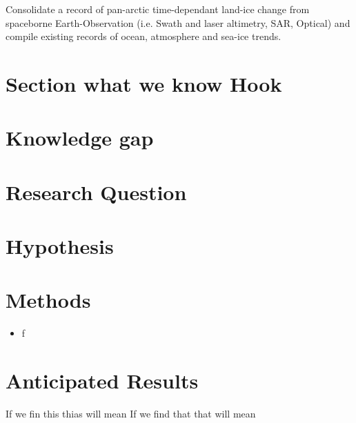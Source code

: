 Consolidate a record of pan-arctic time-dependant land-ice change from spaceborne Earth-Observation (i.e. Swath and laser altimetry, SAR, Optical) and compile existing records of ocean, atmosphere and sea-ice trends.

\section{Section what we know Hook}

\section{Knowledge gap}
\section{Research Question}


\section{Hypothesis}

\section{Methods}

\begin{itemize}
    \item f
\end{itemize}

\section{Anticipated Results}

If we fin this thias will mean
If we find that that will mean